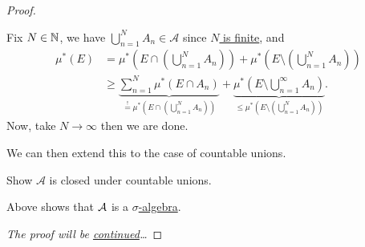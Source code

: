 \begin{proof}
\begin{enumerate}[(1)]
\begin{itemize}
\begin{explanation}
				            Fix \(N\in\mathbb{\MakeUppercase{N}} \), we have \(\bigcup\limits_{n=1}^{N} A_{n}\in \mathcal{A} \) since \hyperref[pf:Caratheodory-extension-Thm-1-finite-unions]{\(N\) is finite}, and
				            \[
					            \begin{split}
						            \mu^{*} (E) &= \mu^{*} \left(E\cap \left(\bigcup\limits_{n=1}^{N} A_{n}\right)\right) + \mu^{*} \left(E\setminus \left(\bigcup\limits_{n=1}^{N} A_{n}\right)\right)\\
						            &\geq \underbrace{\sum\limits_{n=1}^{N} \mu^{*} (E\cap A_{n})}_{ \overset{\hyperref[lma:disjoint-C-measurable-finite-additive]{!}}{=} \mu^{*} \left(E\cap \left(\bigcup\limits_{n=1}^{N} A_{n}\right)\right)} + \underbrace{\mu^{*} \left(E\setminus \bigcup\limits_{n=1}^{\infty} A_{n}\right)}_{\leq \mu^{*} \left(E\setminus \left(\bigcup\limits_{n=1}^{N} A_{n}\right)\right)}.
					            \end{split}
				            \]
				            Now, take \(N\to \infty \) then we are done.
			            \end{explanation}
			            We can then extend this to the case of countable unions.
			            \begin{exercise}
				            Show \(\mathcal{A} \) is closed under countable unions.
			            \end{exercise}
			            \begin{answer}
			            \end{answer}
		      \end{itemize}
		      Above shows that \(\mathcal{\MakeUppercase{a}} \) is a \hyperref[def:sigma-algebra]{\(\sigma\)-algebra}.
	\end{enumerate}
	\emph{The proof will be \hyperref[pf:Caratheodory-extension-Thm-cont]{continued}\ldots}
\end{proof}